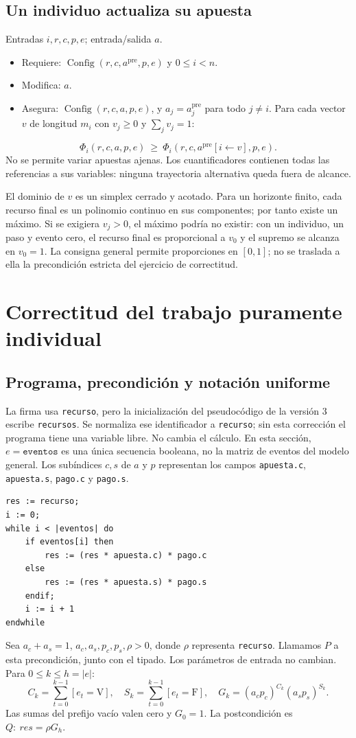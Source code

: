\documentclass[11pt,a4paper]{article}
\newcommand{\len}[1]{\lvert #1\rvert}
\newcommand{\pre}{^{\mathrm{pre}}}
\begin{document}
\begin{samepage}
\subsection{Un individuo actualiza su apuesta}
Entradas $i,r,c,p,e$; entrada/salida $a$.
\begin{itemize}
\item Requiere: $\operatorname{Config}(r,c,a\pre,p,e)$ y $0\leq i<n$.
\item Modifica: $a$.
\item Asegura: $\operatorname{Config}(r,c,a,p,e)$, y
      $a_j=a\pre_j$ para todo $j\neq i$.
      Para cada vector $v$ de longitud $m_i$ con $v_j\geq0$ y
      $\sum_jv_j=1$:
\end{itemize}
\[
 \Phi_i(r,c,a,p,e)\ \geq\
 \Phi_i(r,c,a\pre[i\leftarrow v],p,e).
\]
No se permite variar apuestas ajenas. Los cuantificadores contienen
todas las referencias a sus variables: ninguna trayectoria alternativa
queda fuera de alcance.

El dominio de $v$ es un simplex cerrado y acotado. Para un horizonte
finito, cada recurso final es un polinomio continuo en sus componentes;
por tanto existe un máximo. Si se exigiera $v_j>0$, el máximo podría
no existir: con un individuo, un paso y evento cero, el recurso final
es proporcional a $v_0$ y el supremo se alcanza en $v_0=1$.
La consigna general permite proporciones en $[0,1]$; no se traslada
a ella la precondición estricta del ejercicio de correctitud.
\end{samepage}

\section{Correctitud del trabajo puramente individual}
\subsection{Programa, precondición y notación uniforme}
La firma usa \texttt{recurso}, pero la inicialización del pseudocódigo de
la versión 3 escribe \texttt{recursos}. Se normaliza ese identificador a
\texttt{recurso}; sin esta corrección el programa tiene una variable libre.
No cambia el cálculo. En esta sección, $e=\texttt{eventos}$ es una única
secuencia booleana, no la matriz de eventos del modelo general.
Los subíndices $c,s$ de $a$ y $p$ representan los campos
\texttt{apuesta.c}, \texttt{apuesta.s}, \texttt{pago.c} y \texttt{pago.s}.
\begin{verbatim}
res := recurso;
i := 0;
while i < |eventos| do
    if eventos[i] then
        res := (res * apuesta.c) * pago.c
    else
        res := (res * apuesta.s) * pago.s
    endif;
    i := i + 1
endwhile
\end{verbatim}
Sea $a_c+a_s=1$, $a_c,a_s,p_c,p_s,\rho>0$, donde $\rho$ representa
\texttt{recurso}. Llamamos $P$ a esta precondición, junto con el tipado.
Los parámetros de entrada no cambian. Para $0\leq k\leq h=\len{e}$:
\[
 C_k=\sum_{t=0}^{k-1}[e_t=\mathrm V],\quad
 S_k=\sum_{t=0}^{k-1}[e_t=\mathrm F],\quad
 G_k=(a_cp_c)^{C_k}(a_sp_s)^{S_k}.
\]
Las sumas del prefijo vacío valen cero y $G_0=1$. La postcondición es
$Q:\ res=\rho G_h$.
\end{document}
